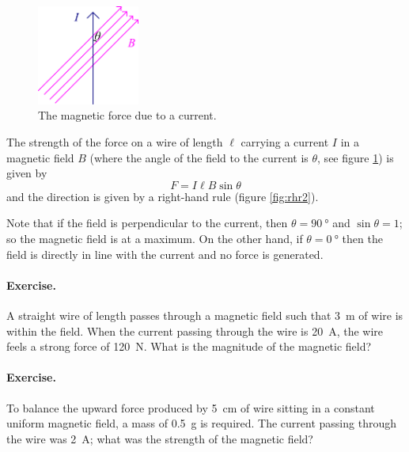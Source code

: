 \documentclass[a4paper]{amsbook}
\begin{document}
\begin{figure}
  \centering
  \includegraphics[width=0.3\textwidth]{magforce1}
  \caption{The magnetic force due to a current.\label{fig:magforce1}}
\end{figure}

The strength of the force on a wire of length $ \ell $ carrying a current $ I $ in a magnetic field $ B $ (where the angle of the field to the current
is $ \theta $, see figure \ref{fig:magforce1}) is given by
\begin{equation}
  F = I \ell B \sin \theta
\end{equation}
and the direction is given by a right-hand rule (figure \ref{fig:rhr2}).

Note that if the field is perpendicular to the current, then $ \theta = \SI{90}{\degree} $ and $ \sin \theta = 1 $; so the magnetic field
is at a maximum. On the other hand, if $ \theta = \SI{0}{\degree} $ then the field is directly in line with the current and no force is
generated.

\paragraph{Exercise.} A straight wire of length passes through a magnetic field such that \SI{3}{\metre} of wire is within the field. When
the current passing through the wire is \SI{20}{\ampere}, the wire feels a strong force of \SI{120}{\newton}. What is the magnitude of the
magnetic field?

\paragraph{Exercise.} To balance the upward force produced by \SI{5}{\centi\metre} of wire sitting in a constant uniform
magnetic field, a mass of \SI{0.5}{\gram} is required. The current passing through the wire was \SI{2}{\ampere}; what was
the strength of the magnetic field?
\end{document}
